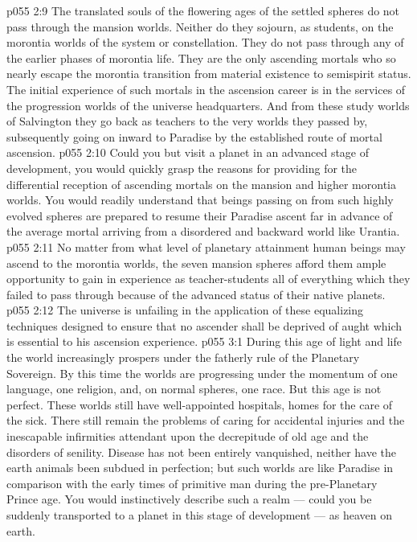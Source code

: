 \vs p055 2:9 \pc The translated souls of the flowering ages of the settled spheres do not pass through the mansion worlds. Neither do they sojourn, as students, on the morontia worlds of the system or constellation. They do not pass through any of the earlier phases of morontia life. They are the only ascending mortals who so nearly escape the morontia transition from material existence to semispirit status. The initial experience of such  mortals in the ascension career is in the services of the progression worlds of the universe headquarters. And from these study worlds of Salvington they go back as teachers to the very worlds they passed by, subsequently going on inward to Paradise by the established route of mortal ascension.
\vs p055 2:10 Could you but visit a planet in an advanced stage of development, you would quickly grasp the reasons for providing for the differential reception of ascending mortals on the mansion and higher morontia worlds. You would readily understand that beings passing on from such highly evolved spheres are prepared to resume their Paradise ascent far in advance of the average mortal arriving from a disordered and backward world like Urantia.
\vs p055 2:11 No matter from what level of planetary attainment human beings may ascend to the morontia worlds, the seven mansion spheres afford them ample opportunity to gain in experience as teacher\hyp{}students all of everything which they failed to pass through because of the advanced status of their native planets.
\vs p055 2:12 The universe is unfailing in the application of these equalizing techniques designed to ensure that no ascender shall be deprived of aught which is essential to his ascension experience.
\vs p055 3:1 During this age of light and life the world increasingly prospers under the fatherly rule of the Planetary Sovereign. By this time the worlds are progressing under the momentum of one language, one religion, and, on normal spheres, one race. But this age is not perfect. These worlds still have well\hyp{}appointed hospitals, homes for the care of the sick. There still remain the problems of caring for accidental injuries and the inescapable infirmities attendant upon the decrepitude of old age and the disorders of senility. Disease has not been entirely vanquished, neither have the earth animals been subdued in perfection; but such worlds are like Paradise in comparison with the early times of primitive man during the pre\hyp{}Planetary Prince age. You would instinctively describe such a realm --- could you be suddenly transported to a planet in this stage of development --- as heaven on earth.

